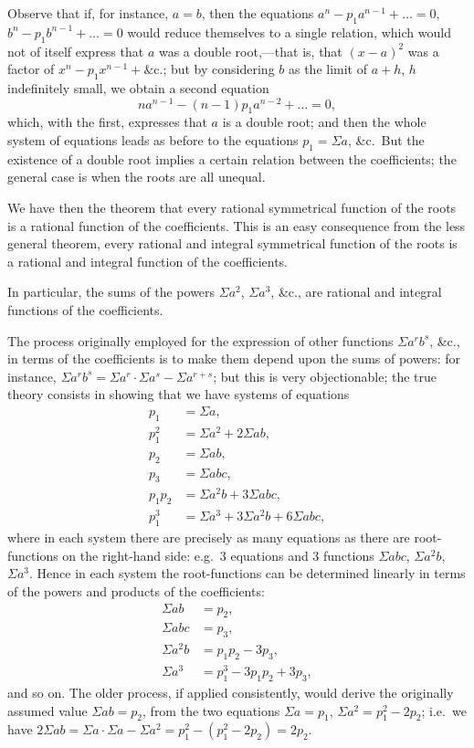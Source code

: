 \documentclass[11pt,a4paper]{book}
\begin{document}
Observe that if, for instance, $a = b$, then the equations $a^{n} - p_{1}a^{n-1} + \ldots = 0$, $b^{n} - p_{1}b^{n-1} + \ldots = 0$ would reduce themselves to a single relation, which would not of itself express that $a$ was a double root,---that is, that $(x - a)^{2}$ was a factor of $x^{n} - p_{1}x^{n-1} + \&$c.; but by considering $b$ as the limit of $a + h$, $h$ indefinitely small, we obtain a second equation
\[
na^{n-1} - (n - 1)p_{1}a^{n-2} + \ldots = 0,
\]
which, with the first, expresses that $a$ is a double root; and then the whole system of equations leads as before to the equations $p_{1} = \Sigma a$, \&c.\ But the existence of a double root implies a certain relation between the coefficients; the general case is when the roots are all unequal.

We have then the theorem that every rational symmetrical function of the roots is a rational function of the coefficients. This is an easy consequence from the less general theorem, every rational and integral symmetrical function of the roots is a rational and integral function of the coefficients.

In particular, the sums of the powers $\Sigma a^{2}$, $\Sigma a^{3}$, \&c., are rational and integral functions of the coefficients.

The process originally employed for the expression of other functions $\Sigma a^{r}b^{s}$, \&c., in terms of the coefficients is to make them depend upon the sums of powers: for instance, $\Sigma a^{r}b^{s} = \Sigma a^{r} \cdot \Sigma a^{s} - \Sigma a^{r+s}$; but this is very objectionable; the true theory consists in showing that we have systems of equations
\begin{align*}
p_{1} &= \Sigma a, \\
p_{1}^{2} &= \Sigma a^{2} + 2\Sigma ab, \\
p_{2} &= \Sigma ab, \\
p_{3} &= \Sigma abc, \\
p_{1}p_{2} &= \Sigma a^{2}b + 3\Sigma abc, \\
p_{1}^{3} &= \Sigma a^{3} + 3\Sigma a^{2}b + 6\Sigma abc,
\end{align*}
where in each system there are precisely as many equations as there are root-functions on the right-hand side: e.g.\ 3 equations and 3 functions $\Sigma abc$, $\Sigma a^{2}b$, $\Sigma a^{3}$. Hence in each system the root-functions can be determined linearly in terms of the powers and products of the coefficients:
\begin{align*}
\Sigma ab &= p_{2}, \\
\Sigma abc &= p_{3}, \\
\Sigma a^{2}b &= p_{1}p_{2} - 3p_{3}, \\
\Sigma a^{3} &= p_{1}^{3} - 3p_{1}p_{2} + 3p_{3},
\end{align*}
and so on. The older process, if applied consistently, would derive the originally assumed value $\Sigma ab = p_{2}$, from the two equations $\Sigma a = p_{1}$, $\Sigma a^{2} = p_{1}^{2} - 2p_{2}$; i.e.\ we have $2\Sigma ab = \Sigma a \cdot \Sigma a - \Sigma a^{2} = p_{1}^{2} - (p_{1}^{2} - 2p_{2}) = 2p_{2}$.
\end{document}
